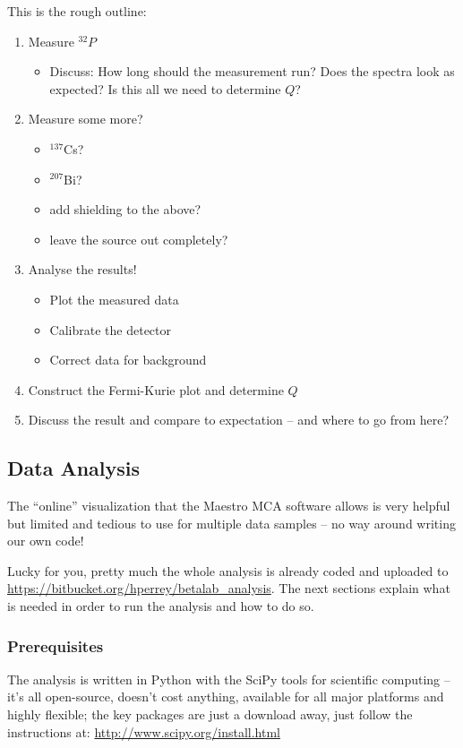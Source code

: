\documentclass[a4,11pt, notitlepage]{article}
\begin{document}
This is the rough outline:
\begin{enumerate}
\item Measure $^{32}P$
  \begin{itemize}
  \item Discuss: How long should the measurement run? Does the spectra
    look as expected? Is this all we need to determine $Q$?
  \end{itemize}
\item Measure some more?
  \begin{itemize}
  \item $^{137}$Cs?
  \item $^{207}$Bi?
  \item add shielding to the above?
  \item leave the source out completely?
  \end{itemize}
\item Analyse the results!
  \begin{itemize}
  \item Plot the measured data
  \item Calibrate the detector
  \item Correct data for background
  \end{itemize}
\item Construct the Fermi-Kurie plot and determine $Q$
\item Discuss the result and compare to expectation -- and where to go
  from here?
\end{enumerate}

\subsection{Data Analysis}
\label{sec:data-analysis}

The ``online'' visualization that the Maestro MCA software allows is
very helpful but limited and tedious to use for multiple data samples
-- no way around writing our own code!

Lucky for you, pretty much the whole analysis is already coded and
uploaded to
\url{https://bitbucket.org/hperrey/betalab_analysis}. The next
sections explain what is needed in order to run the analysis and how
to do so.

\subsubsection{Prerequisites}
\label{sec:prerequisites}

The analysis is written in Python with the SciPy tools for scientific
computing -- it's all open-source, doesn't cost anything, available
for all major platforms and highly flexible; the key packages are just
a download away, just follow the instructions at: \url{http://www.scipy.org/install.html}
\end{document}
